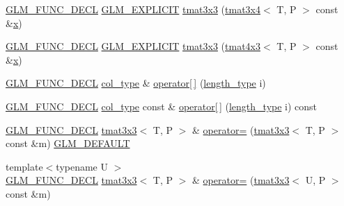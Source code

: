 \begin{DoxyCompactItemize}
\item 
\mbox{\hyperlink{setup_8hpp_ab2d052de21a70539923e9bcbf6e83a51}{G\+L\+M\+\_\+\+F\+U\+N\+C\+\_\+\+D\+E\+CL}} \mbox{\hyperlink{setup_8hpp_a6c74f5a5e7b134ab69023ff9a30d4d5d}{G\+L\+M\+\_\+\+E\+X\+P\+L\+I\+C\+IT}} \mbox{\hyperlink{structglm_1_1tmat3x3_a1498a92906adaa18834058fbea37a808}{tmat3x3}} (\mbox{\hyperlink{structglm_1_1tmat3x4}{tmat3x4}}$<$ T, P $>$ const \&\mbox{\hyperlink{glad_8h_a92d0386e5c19fb81ea88c9f99644ab1d}{x}})
\item 
\mbox{\hyperlink{setup_8hpp_ab2d052de21a70539923e9bcbf6e83a51}{G\+L\+M\+\_\+\+F\+U\+N\+C\+\_\+\+D\+E\+CL}} \mbox{\hyperlink{setup_8hpp_a6c74f5a5e7b134ab69023ff9a30d4d5d}{G\+L\+M\+\_\+\+E\+X\+P\+L\+I\+C\+IT}} \mbox{\hyperlink{structglm_1_1tmat3x3_aca274ab9905b48dac255a6ae295dc193}{tmat3x3}} (\mbox{\hyperlink{structglm_1_1tmat4x3}{tmat4x3}}$<$ T, P $>$ const \&\mbox{\hyperlink{glad_8h_a92d0386e5c19fb81ea88c9f99644ab1d}{x}})
\item 
\mbox{\hyperlink{setup_8hpp_ab2d052de21a70539923e9bcbf6e83a51}{G\+L\+M\+\_\+\+F\+U\+N\+C\+\_\+\+D\+E\+CL}} \mbox{\hyperlink{structglm_1_1tmat3x3_a0b80bddb3cb4e01aa04d1c7a5a47365a}{col\+\_\+type}} \& \mbox{\hyperlink{structglm_1_1tmat3x3_a168abb413d19f4ff78005b4a4015c9e1}{operator\mbox{[}$\,$\mbox{]}}} (\mbox{\hyperlink{structglm_1_1tmat3x3_a78fa6e6e406213fa0049b5125b2686b5}{length\+\_\+type}} i)
\item 
\mbox{\hyperlink{setup_8hpp_ab2d052de21a70539923e9bcbf6e83a51}{G\+L\+M\+\_\+\+F\+U\+N\+C\+\_\+\+D\+E\+CL}} \mbox{\hyperlink{structglm_1_1tmat3x3_a0b80bddb3cb4e01aa04d1c7a5a47365a}{col\+\_\+type}} const  \& \mbox{\hyperlink{structglm_1_1tmat3x3_ac5c2bd620ce28afd0fce23119765049e}{operator\mbox{[}$\,$\mbox{]}}} (\mbox{\hyperlink{structglm_1_1tmat3x3_a78fa6e6e406213fa0049b5125b2686b5}{length\+\_\+type}} i) const
\item 
\mbox{\hyperlink{setup_8hpp_ab2d052de21a70539923e9bcbf6e83a51}{G\+L\+M\+\_\+\+F\+U\+N\+C\+\_\+\+D\+E\+CL}} \mbox{\hyperlink{structglm_1_1tmat3x3}{tmat3x3}}$<$ T, P $>$ \& \mbox{\hyperlink{structglm_1_1tmat3x3_a6a587ae3bc7c9ad30a5d05a789a809db}{operator=}} (\mbox{\hyperlink{structglm_1_1tmat3x3}{tmat3x3}}$<$ T, P $>$ const \&m) \mbox{\hyperlink{setup_8hpp_aefce7051c376a64ba89fa93a9f63bc2c}{G\+L\+M\+\_\+\+D\+E\+F\+A\+U\+LT}}
\item 
{\footnotesize template$<$typename U $>$ }\\\mbox{\hyperlink{setup_8hpp_ab2d052de21a70539923e9bcbf6e83a51}{G\+L\+M\+\_\+\+F\+U\+N\+C\+\_\+\+D\+E\+CL}} \mbox{\hyperlink{structglm_1_1tmat3x3}{tmat3x3}}$<$ T, P $>$ \& \mbox{\hyperlink{structglm_1_1tmat3x3_a4cfacf82df6bb99bca19076bfd27c3f9}{operator=}} (\mbox{\hyperlink{structglm_1_1tmat3x3}{tmat3x3}}$<$ U, P $>$ const \&m)

\end{DoxyCompactItemize}
